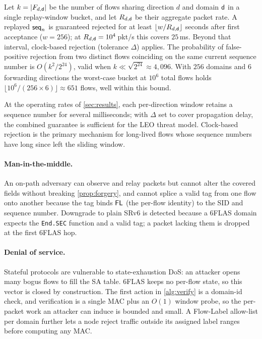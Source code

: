 \begin{proposition}
\label{prop:replay}
Let $k = |F_{d,\mathsf{d}}|$ be the number of flows sharing direction $d$ and
domain $\mathsf{d}$ in a single replay-window bucket, and let $R_{d,\mathsf{d}}$ be
their aggregate packet rate. A replayed $\mathsf{seq}_n$ is guaranteed rejected for
at least $\lfloor w/R_{d,\mathsf{d}} \rfloor$ seconds after first acceptance
($w=256$); at $R_{d,\mathsf{d}}=10^4$\,pkt/s this covers $25$\,ms. Beyond that
interval, clock-based rejection (tolerance $\Delta$) applies. The probability
of false-positive rejection from two distinct flows coinciding on the same
current sequence number is $O(k^2/2^{24})$, valid when
$k \ll \sqrt{2^{24}} \approx 4{,}096$. With $256$ domains and $6$ forwarding
directions the worst-case bucket at $10^6$ total flows holds
$\lfloor 10^6/(256{\times}6) \rfloor \approx 651$ flows, well within this bound.
\end{proposition}

At the operating rates of \cref{sec:results}, each per-direction window retains
a sequence number for several milliseconds; with $\Delta$ set to cover
propagation delay, the combined guarantee is sufficient for the LEO threat model.
Clock-based rejection is the primary mechanism for long-lived flows whose
sequence numbers have long since left the sliding window.

\paragraph{Man-in-the-middle.}
An on-path adversary can observe and relay packets but cannot alter the covered
fields without breaking \cref{prop:forgery}, and cannot splice a valid tag from
one flow onto another because the tag binds $\mathsf{FL}$ (the per-flow identity) to the
SID and sequence number. Downgrade to plain SRv6 is detected because a 6FLAS
domain expects the \texttt{End.SEC} function and a valid tag; a packet lacking
them is dropped at the first 6FLAS hop.

\paragraph{Denial of service.}
Stateful protocols are vulnerable to state-exhaustion DoS: an attacker opens
many bogus flows to fill the SA table. 6FLAS keeps no per-flow state, so this
vector is closed by construction. The first action in \cref{alg:verify} is a
domain-id check, and verification is a single MAC plus an $O(1)$ window probe,
so the per-packet work an attacker can induce is bounded and small. A Flow-Label
allow-list per domain further lets a node reject traffic outside its assigned
label ranges before computing any MAC.

